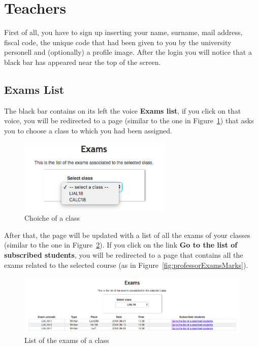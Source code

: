 \newpage
\section{Teachers}
First of all, you have to sign up inserting your name, surname, mail address, fiscal code, the unique code that had been given to you by the university personell and (optionally) a profile image.
After the login you will notice that a black bar has appeared near the top of the screen. 

\subsection{Exams List}
The black bar contains on its left the voice \textbf{Exams list}, if you click on that voice, you will be redirected to a page (similar to the one in Figure~\ref{fig:professorChooseExam}) that asks you to choose a class to which you had been assigned.
\begin{figure}[H]
	\centering
	\includegraphics[width=0.65\textwidth]{img/professorChooseExam.png}
	\caption{Choiche of a class}
	\label{fig:professorChooseExam}
\end{figure}

After that, the page will be updated with a list of all the exams of your classes (similar to the one in Figure~\ref{fig:professorExamsList}). If you click on the link \textbf{Go to the list of subscribed students}, you will be redirected to a page that contains all the exams related to the selected course (as in Figure~\ref{fig:professorExamsMarks}).
\begin{figure}[H]
\centering
\includegraphics[width=1.0\textwidth]{img/professorExamsList.png}
\caption{List of the exams of a class}
\label{fig:professorExamsList}
\end{figure}

